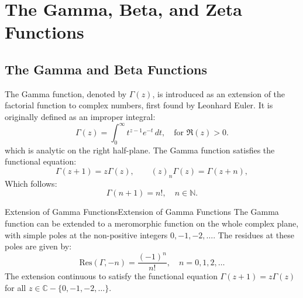 \documentclass[../main.tex]{subfiles}
\begin{document}
\chapter{The Gamma, Beta, and Zeta Functions}

\section{The Gamma and Beta Functions}
The Gamma function, denoted by $\Gamma(z)$, is introduced as an extension of the factorial function to complex numbers, first found by Leonhard Euler. It is originally defined as an improper integral:
\begin{equation}
    \Gamma(z) = \int_0^\infty t^{z-1} e^{-t} \, dt, \quad \text{for } \Re(z) > 0.
\end{equation}
which is analytic on the right half-plane. The Gamma function satisfies the functional equation:
\begin{equation}
    \Gamma(z+1) = z \Gamma(z), \qquad (z)_n \Gamma(z) = \Gamma(z+n),
\end{equation}
Which follows:
\begin{equation}
	\Gamma(n+1) = n!, \quad n \in \mathbb{N}.
\end{equation}

\begin{theorem}{Extension of Gamma Functions}{Extension of Gamma Functions}
	The Gamma function can be extended to a meromorphic function on the whole complex plane, with simple poles at the non-positive integers $0,-1,-2, \ldots $. The residues at these poles are given by:
	\begin{equation}
		\text{Res}(\Gamma, -n) = \frac{(-1)^n}{n!}, \quad n = 0, 1, 2, \ldots
	\end{equation}
	The extension continuous to satisfy the functional equation $\Gamma(z+1) = z \Gamma(z)$ for all $z \in \mathbb{C} - \{0, -1, -2, \ldots\}$.
\end{theorem}
\end{document}
